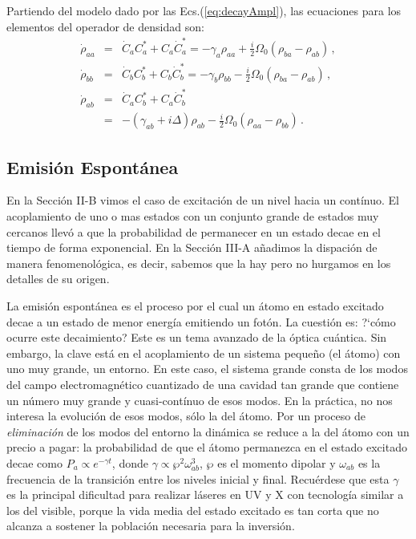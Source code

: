 \documentclass[twocolumn,aps,eqsecnum]{revtex4}
\begin{document}
Partiendo del modelo dado por las Ecs.(\ref{eq:decayAmpl}), las ecuaciones 
para los elementos del operador de densidad son:
%
\begin{eqnarray}
\dot{\rho}_{aa} &=& \dot{C}_a C_a^{\ast} + C_a \dot{C}_a^{\ast}   
    = -\gamma_a \rho_{aa} + \frac{i}{2} \Omega_0 (\rho_{ba} - \rho_{ab}) \,, 
    	\nonumber \\ 
\dot{\rho}_{bb} &=& \dot{C}_b C_b^{\ast} + C_b \dot{C}_b^{\ast}  
  = -\gamma_b \rho_{bb} - \frac{i}{2} \Omega_0 (\rho_{ba} - \rho_{ab}) \,, 
  	\nonumber \\ 
\dot{\rho}_{ab} &=& \dot{C}_a C_b^{\ast} + C_a \dot{C}_b^{\ast}  \nonumber \\ 
  	&=& - (\gamma_{ab} +i\Delta) \rho_{ab} 
  	- \frac{i}{2} \Omega_0 (\rho_{aa} - \rho_{bb})  \,.
\end{eqnarray}

\subsection{Emisi\'on Espont\'anea} 
En la Secci\'on II-B vimos el caso de excitaci\'on de un nivel hacia un cont\'inuo. 
El acoplamiento de uno o mas estados con un conjunto grande de estados muy 
cercanos llev\'o a que la probabilidad de permanecer en un estado decae en el 
tiempo de forma exponencial. En la Secci\'on III-A a\~nadimos la dispaci\'on de 
manera fenomenol\'ogica, es decir, sabemos que la hay pero no hurgamos en 
los detalles de su origen.   

La emisi\'on espont\'anea es el proceso por el cual un \'atomo en estado 
excitado decae a un estado de menor energ\'ia emitiendo un fot\'on. La 
cuesti\'on es: ?`c\'omo ocurre este decaimiento? Este es un tema avanzado 
de la \'optica cu\'antica. Sin embargo, la clave est\'a en el acoplamiento de un 
sistema peque\~no (el \'atomo) con uno muy grande, un entorno. En este 
caso, el sistema grande consta de los modos del campo electromagn\'etico 
cuantizado de una cavidad tan grande que contiene un n\'umero muy grande y 
cuasi-cont\'inuo de esos modos. En la pr\'actica, no nos interesa la evoluci\'on 
de esos modos, s\'olo la del \'atomo. Por un proceso de \textit{eliminaci\'on} de 
los modos del entorno la din\'amica se reduce a la del \'atomo con un precio a 
pagar: la probabilidad de que el \'atomo permanezca en el estado excitado 
decae como $P_a \propto e^{-\gamma t}$, donde 
$\gamma \propto \wp^2 \omega_{ab}^3$, $\wp$ es el momento dipolar y 
$\omega_{ab}$ es la frecuencia de la transici\'on entre los niveles inicial y 
final.  Recu\'erdese que esta $\gamma$ es la principal dificultad para realizar 
l\'aseres en UV y X con tecnolog\'ia similar a los del visible, porque la vida 
media del estado excitado es tan corta que no alcanza a sostener la 
poblaci\'on necesaria para la inversi\'on.   
\end{document}
